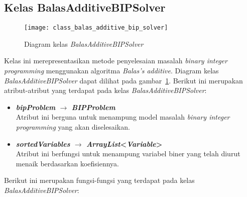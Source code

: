 \subsection{Kelas BalasAdditiveBIPSolver}
\begin{figure}[H]
	\centering  
	\texttt{[image: class\_balas\_additive\_bip\_solver]}
	\caption[Diagram kelas \textit{BalasAdditiveBIPSolver}]{Diagram kelas \textit{BalasAdditiveBIPSolver}}
	\label{fig:class_balas_additive_bip_solver}
\end{figure}
Kelas ini merepresentasikan metode penyelesaian masalah \textit{binary integer programming} menggunakan algoritma \textit{Balas's additive}. Diagram kelas \textit{BalasAdditiveBIPSolver} dapat dilihat pada gambar~\ref{fig:class_balas_additive_bip_solver}. Berikut ini merupakan atribut-atribut yang terdapat pada kelas \textit{BalasAdditiveBIPSolver}:
\begin{itemize}
	\item \textbf{\textit{bipProblem} $\rightarrow$ \textit{BIPProblem}}\\
	Atribut ini berguna untuk menampung model masalah \textit{binary integer programming} yang akan diselesaikan.
	\item \textbf{\textit{sortedVariables} $\rightarrow$ \textit{ArrayList}<\textit{Variable}>}\\
	Atribut ini berfungsi untuk menampung variabel biner yang telah diurut menaik berdasarkan koefisiennya.
\end{itemize}
Berikut ini merupakan fungsi-fungsi yang terdapat pada kelas \textit{BalasAdditiveBIPSolver}:
